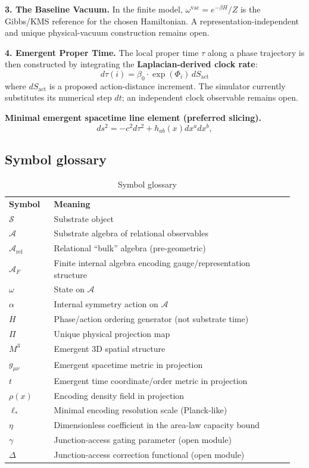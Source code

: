 \documentclass[reprint, amsmath, amssymb, aps, prd]{revtex4-2}
\begin{document}
\textbf{3. The Baseline Vacuum.} In the finite model, $\omega^{\text{vac}}=e^{-\beta H}/Z$ is the Gibbs/KMS reference for the chosen Hamiltonian. A representation-independent and unique physical-vacuum construction remains open.

\textbf{4. Emergent Proper Time.} The local proper time $\tau$ along a phase trajectory is then constructed by integrating the \textbf{Laplacian-derived clock rate}:
\begin{equation}
d\tau(i) = \beta_0 \cdot \exp(\Phi_i) \, dS_{\text{act}}
\end{equation}
where $dS_{\text{act}}$ is a proposed action-distance increment. The simulator currently substitutes its numerical step $dt$; an independent clock observable remains open.

\textbf{Minimal emergent spacetime line element (preferred slicing).}
\begin{equation}
ds^2 = -c^2 d\tau^2 + h_{ab}(x) dx^a dx^b,
\end{equation}

\subsection{Symbol glossary}
\begin{table}[htbp]
\caption{Symbol glossary}
\begin{ruledtabular}
\begin{tabular}{p{0.15\linewidth} p{0.8\linewidth}}
\textbf{Symbol} & \textbf{Meaning} \\
\colrule
$\mathcal{S}$ & Substrate object \\
$\mathcal{A}$ & Substrate algebra of relational observables \\
$\mathcal{A}_{\text{rel}}$ & Relational ``bulk'' algebra (pre-geometric) \\
$\mathcal{A}_F$ & Finite internal algebra encoding gauge/representation structure \\
$\omega$ & State on $\mathcal{A}$ \\
$\alpha$ & Internal symmetry action on $\mathcal{A}$ \\
$H$ & Phase/action ordering generator (not substrate time) \\
$\Pi$ & Unique physical projection map \\
$M^3$ & Emergent 3D spatial structure \\
$g_{\mu\nu}$ & Emergent spacetime metric in projection \\
$t$ & Emergent time coordinate/order metric in projection \\
$\rho(x)$ & Encoding density field in projection \\
$\ell_*$ & Minimal encoding resolution scale (Planck-like) \\
$\eta$ & Dimensionless coefficient in the area-law capacity bound \\
$\gamma$ & Junction-access gating parameter (open module) \\
$\Delta$ & Junction-access correction functional (open module) \\
\end{tabular}
\end{ruledtabular}
\end{table}
\end{document}
